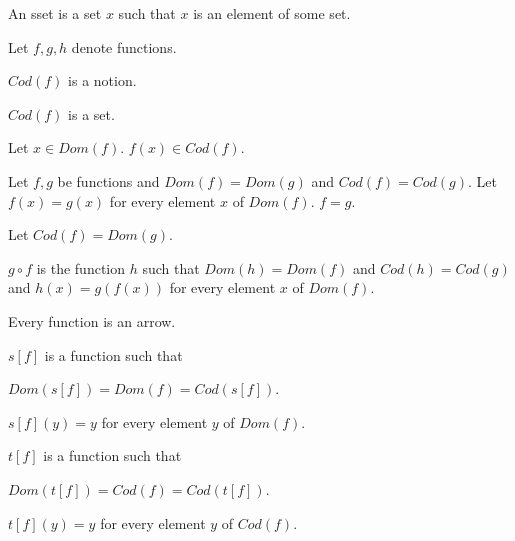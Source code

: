 \documentclass{article}
\begin{document}
	\begin{forthel}
		

		\begin{definition} 
			An sset is a set $x$ such that $x$ is an element of some set.
		\end{definition}
		
		Let $f,g,h$ denote functions.
		
		\begin{signature} 
			$Cod(f)$ is a notion. 
		\end{signature}

		\begin{axiom} 
			$Cod(f)$ is a set. 
		\end{axiom}
		
		\begin{axiom} 
			Let $x \in  Dom(f)$. $f(x) \in Cod(f)$.
		\end{axiom}

		\begin{axiom}[Ext]
			Let $f,g$ be functions and $Dom(f) = Dom(g)$ and $Cod(f) = Cod(g)$.
			Let $f(x) = g(x)$ for every element $x$ of $Dom(f)$.
			$f = g$.
		\end{axiom}
		
		\begin{definition} 
			Let $Cod(f)=Dom(g)$. 
			
			$g \circ f$ is the function $h$ such that
			$Dom(h)=Dom(f)$ and $Cod(h)=Cod(g)$ and $h(x)=g(f(x))$ for every element $x$ of $Dom(f)$.
		\end{definition}
		

		
		\begin{axiom}
			Every function is an arrow.
		\end{axiom}
		
		\begin{axiom}		
			$s[f]$ is a function such that 
			
			$Dom(s[f])=Dom(f)=Cod(s[f])$.
		\end{axiom}
		
		\begin{axiom} 
			$s[f](y)=y$ for every element $y$ of $Dom(f)$.
		\end{axiom}
		

		\begin{axiom}		
			$t[f]$ is a function such that 
			
			$Dom(t[f])=Cod(f)=Cod(t[f])$.
		\end{axiom}
		
		\begin{axiom} 
			$t[f](y)=y$ for every element $y$ of $Cod(f)$.
		\end{axiom}
		

\end{forthel}
\end{document}
